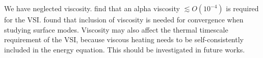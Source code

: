 We have neglected viscosity.  find that an alpha
viscosity $\lesssim O(10^{-4})$ is required for the
VSI.  found that inclusion of viscosity is needed for 
convergence when studying surface modes. %
Viscosity may also affect the
thermal timescale requirement of the VSI, because viscous heating
needs to be self-consistently included in the energy equation. This
should be investigated in future works.   



